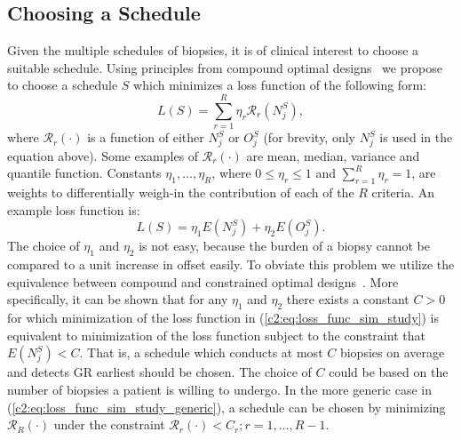 \subsection{Choosing a Schedule}
\label{c2:subsec:optimal_schedule}
Given the multiple schedules of biopsies, it is of clinical interest to choose a suitable schedule. Using principles from compound optimal designs~\citep{lauter1976optimal} we propose to choose a schedule $S$ which minimizes a loss function of the following form:
\begin{equation}
\label{c2:eq:loss_func_sim_study_generic}
L(S) = \sum_{r=1}^R \eta_r \mathcal{R}_r(N^S_j),
\end{equation}
where $\mathcal{R}_r(\cdot)$ is a function of either $N^S_j$ or $O^S_j$ (for brevity, only $N^S_j$ is used in the equation above). Some examples of $\mathcal{R}_r(\cdot)$ are mean, median, variance and quantile function. Constants $\eta_1, \ldots, \eta_R$, where $0 \leq \eta_r \leq 1$ and $\sum_{r=1}^R \eta_r = 1$, are weights to differentially weigh-in the contribution of each of the $R$ criteria. An example loss function is:
\begin{equation}
\label{c2:eq:loss_func_sim_study}
L(S) = \eta_1 E(N^S_j) + \eta_2 E(O^S_j).
\end{equation}
The choice of $\eta_1$ and $\eta_2$ is not easy, because the burden of a biopsy cannot be compared to a unit increase in offset easily. To obviate this problem we utilize the equivalence between compound and constrained optimal designs~\citep{cook1994equivalence}. More specifically, it can be shown that for any $\eta_1$ and $\eta_2$ there exists a constant $C>0$ for which minimization of the loss function in (\ref{c2:eq:loss_func_sim_study}) is equivalent to minimization of the loss function subject to the constraint that $E(N^S_j) < C$. That is, a schedule which conducts at most $C$ biopsies on average and detects GR earliest should be chosen. The choice of $C$ could be based on the number of biopsies a patient is willing to undergo. In the more generic case in (\ref{c2:eq:loss_func_sim_study_generic}), a schedule can be chosen by minimizing $\mathcal{R}_R(\cdot)$ under the constraint $\mathcal{R}_r(\cdot) < C_r; r=1, \ldots, R-1$.